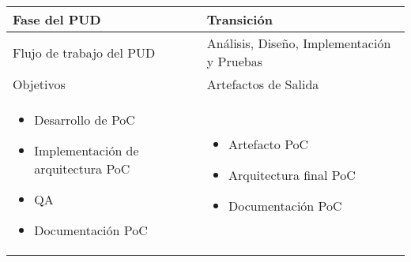 \vspace{1cm}
\begin{tabular}{|p{}|p{}|}

\hline

\cellcolor[gray]{0.7}Fase del \acs{PUD} & Transición
 \\
\hline

\cellcolor[gray]{0.7}Flujo de trabajo del \acs{PUD} & Análisis, Diseño,
Implementación y Pruebas
 \\
\hline


\cellcolor[gray]{0.7}Objetivos  &
\cellcolor[gray]{0.7}Artefactos de Salida \\
\hline

\begin{itemize}
\item Desarrollo de \acs{PoC}
\item Implementación de arquitectura \acs{PoC}
\item \acs{QA}
\item Documentación \acs{PoC}
\end{itemize}

&

\begin{itemize}
\item Artefacto \acs{PoC}
\item Arquitectura final \acs{PoC}
\item Documentación \acs{PoC}
\end{itemize}
\\
\hline
\end{tabular}


